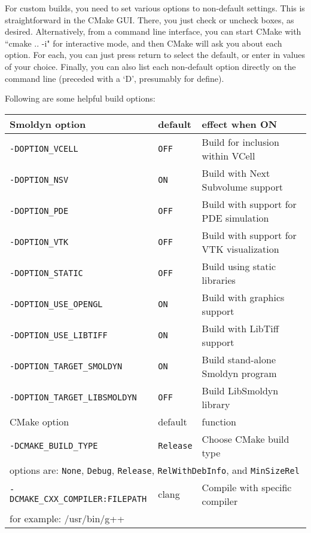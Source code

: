 \documentclass {book}
\begin{document}
For custom builds, you need to set various options to non-default settings.  This is straightforward in the CMake GUI.  There, you just check or uncheck boxes, as desired.  Alternatively, from a command line interface, you can start CMake with ``cmake .. -i" for interactive mode, and then CMake will ask you about each option.  For each, you can just press return to select the default, or enter in values of your choice.  Finally, you can also list each non-default option directly on the command line (preceded with a `D', presumably for define).

Following are some helpful build options:

\begin{longtable}[c]{lll}
Smoldyn option & default & effect when ON\\
\hline
\texttt{-DOPTION\_VCELL} & \texttt{OFF} & Build for inclusion within VCell\\
\texttt{-DOPTION\_NSV} & \texttt{ON} & Build with Next Subvolume support\\
\texttt{-DOPTION\_PDE} & \texttt{OFF} & Build with support for PDE simulation\\
\texttt{-DOPTION\_VTK} & \texttt{OFF} & Build with support for VTK visualization\\
\texttt{-DOPTION\_STATIC} & \texttt{OFF} & Build using static libraries\\
\texttt{-DOPTION\_USE\_OPENGL} & \texttt{ON} & Build with graphics support\\
\texttt{-DOPTION\_USE\_LIBTIFF} & \texttt{ON} & Build with LibTiff support\\
\texttt{-DOPTION\_TARGET\_SMOLDYN} & \texttt{ON} & Build stand-alone Smoldyn program\\
\texttt{-DOPTION\_TARGET\_LIBSMOLDYN} & \texttt{OFF} & Build LibSmoldyn library\\
\hline
CMake option & default & function\\
\hline
\texttt{-DCMAKE\_BUILD\_TYPE} & \texttt{Release} & Choose CMake build type\\
\multicolumn{3}{l}{\hspace{0.3in}options are: \texttt{None}, \texttt{Debug}, \texttt{Release}, \texttt{RelWithDebInfo}, and \texttt{MinSizeRel}}\\
\texttt{-DCMAKE\_CXX\_COMPILER:FILEPATH} & clang & Compile with specific compiler\\
\multicolumn{3}{l}{\hspace{0.3in}for example: /usr/bin/g++}\\
\end{longtable}
\end{document}
